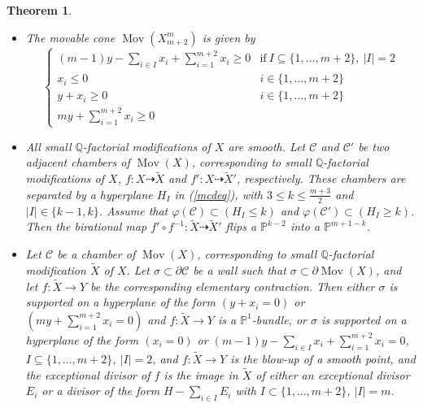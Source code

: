 \documentclass[a4paper,10pt]{amsart}
\newtheorem{thm}{Theorem}[section]
\theoremstyle{definition}
\renewcommand{\P}{\mathbb{P}}
\DeclareMathOperator{\Mov}{Mov}
\begin{document}
\begin{thm}
\begin{itemize}
\begin{equation}\label{mcdeq}
\left\{
\begin{array}{ll}
(2-k)y-\sum_{i\in I}x_i=0 & \text{if}\ I\subseteq \{1,\dots,m+2\}, \: |I|=k-1\\ 
(m-k+1)y-\sum_{i\in I}x_i+\sum_{i=1}^{m+2}x_i=0 & \text{if}\ I\subseteq \{1,\dots,m+2\}, \: |I|=k
\end{array}  
\right.
\end{equation}
with $2\leq k\leq \frac{m+3}{2}$.
\item[-] The movable cone $\Mov(X_{m+2}^m)$ is given by 
$$
\left\{
\begin{array}{ll}
(m-1)y-\sum_{i\in I}x_i+\sum_{i=1}^{m+2}x_i\geq 0 & \text{if}\ I\subseteq \{1,\dots,m+2\}, \: |I|=2\\ 
x_i\leq 0 & i\in \{1,\dots,m+2\}\\
y+x_i\geq 0 & i\in\{1,\dots,m+2\}\\ 
my+\sum_{i=1}^{m+2}x_i\geq 0
\end{array}  
\right.
$$
\item[-] All small $\mathbb{Q}$-factorial modifications of $X$ are smooth. Let $\mathcal{C}$ and $\mathcal{C}'$ be two adjacent chambers of $\Mov(X)$, corresponding 
		to small $\mathbb{Q}$-factorial modifications of $X$, $f:X\dasharrow \widetilde{X}$ and $f':X\dasharrow\widetilde{X}'$, respectively. These chambers are separated by a hyperplane $H_I$ in (\ref{mcdeq}), with $3\leq k\leq \frac{m+3}{2}$ and $|I|\in \{k-1,k\}$. Assume that $\varphi(\mathcal{C})\subset (H_I \leq  k)$ and $\varphi(\mathcal{C}')\subset (H_I \geq  k)$. Then the birational map $f'\circ f^{-1}:\widetilde{X} \dasharrow \widetilde{X}'$ flips a $\P^{k-2}$ into a $\P^{m+1-k}$.
\item[-] Let $\mathcal{C}$ be a chamber of $\Mov(X)$, corresponding to small $\mathbb{Q}$-factorial modification $\widetilde{X}$ of $X$. Let $\sigma\subset \partial \mathcal{C}$ be a wall such that $\sigma\subset \partial \Mov(X)$, and let $f:\widetilde{X}\rightarrow Y$ be the corresponding elementary contraction. Then either $\sigma$ is supported on a hyperplane of the form $(y+x_i=0)$ or $(my+\sum_{i=1}^{m+2}x_i=0)$ and $f:\widetilde{X}\to Y$ is a $\P^1$-bundle, or $\sigma$ is supported on a hyperplane of the form $(x_i=0)$ or $(m-1)y-\sum_{i\in I}x_i+\sum_{i=1}^{m+2}x_i=0$, $I\subseteq \{1,\dots,m+2\}$, $|I|=2$, and $f:\widetilde{X}\to Y$ is the blow-up of a smooth point, and the exceptional divisor of $f$ is the image in $\widetilde{X}$ of either an exceptional divisor $E_{i}$ or a divisor of the form $H-\sum_{i\in I}E_i$ with $I\subset\{1,\dots,m+2\}$, $|I|=m$.
\end{itemize}
\end{thm}
\end{document}
